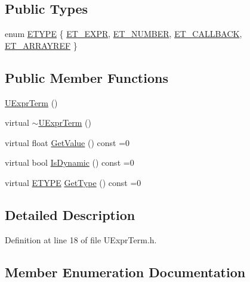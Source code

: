\subsection*{Public Types}
\begin{CompactItemize}
\item 
enum \hyperlink{class_u_expr_term_20f132fb3c5e0228623e4268ba0d06c2}{ETYPE} \{ \hyperlink{class_u_expr_term_20f132fb3c5e0228623e4268ba0d06c270b8888e77ec8fedf43bf0a9edd90a09}{ET\_\-EXPR}, 
\hyperlink{class_u_expr_term_20f132fb3c5e0228623e4268ba0d06c2b73bfabbecee933a6a87b71896ce29e9}{ET\_\-NUMBER}, 
\hyperlink{class_u_expr_term_20f132fb3c5e0228623e4268ba0d06c235b8b423cb038cdf3cd6284529840883}{ET\_\-CALLBACK}, 
\hyperlink{class_u_expr_term_20f132fb3c5e0228623e4268ba0d06c243a480eaeeefdb64f0e41ffc3956b9eb}{ET\_\-ARRAYREF}
 \}
\subsection*{Public Member Functions}
\begin{CompactItemize}
\item 
\hyperlink{class_u_expr_term_a3d517174174a67f8991f3da8dc42df0}{UExprTerm} ()
\item 
virtual \hyperlink{class_u_expr_term_4043e63cb432640ba504864e31a62af3}{$\sim$UExprTerm} ()
\item 
virtual float \hyperlink{class_u_expr_term_85274403764fb0e4cc701a0374fd6592}{GetValue} () const =0
\item 
virtual bool \hyperlink{class_u_expr_term_0b0a24c60fecb1a7388e4b01e2f73572}{IsDynamic} () const =0
\item 
virtual \hyperlink{class_u_expr_term_20f132fb3c5e0228623e4268ba0d06c2}{ETYPE} \hyperlink{class_u_expr_term_fc66ae4dfe6a112d107183840d753562}{GetType} () const =0
\end{CompactItemize}


\subsection{Detailed Description}


Definition at line 18 of file UExprTerm.h.

\subsection{Member Enumeration Documentation}
\hypertarget{class_u_expr_term_20f132fb3c5e0228623e4268ba0d06c2}{
}
\end{CompactItemize}
